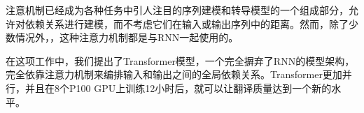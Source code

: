 
注意机制已经成为各种任务中引人注目的序列建模和转导模型的一个组成部分，允许对依赖关系进行建模，而不考虑它们在输入或输出序列中的距离\citep{bahdanau2014neural, structuredAttentionNetworks}。然而，除了少数情况外，\citep{decomposableAttnModel}，这种注意力机制都是与RNN一起使用的。



在这项工作中，我们提出了Transformer模型，一个完全摒弃了RNN的模型架构，完全依靠注意力机制来编排输入和输出之间的全局依赖关系。Transformer更加并行，并且在8个P100 GPU上训练12小时后，就可以让翻译质量达到一个新的水平。


